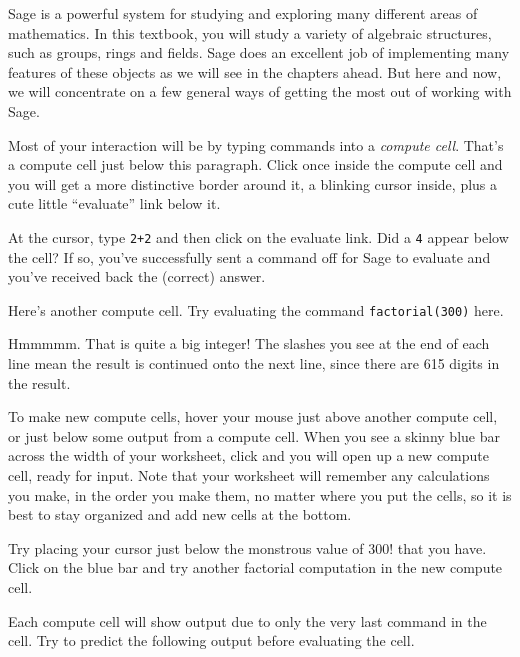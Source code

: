 Sage is a powerful system for studying and exploring many different areas of mathematics.  In this textbook, you will study a variety of algebraic structures, such as groups, rings and fields.  Sage does an excellent job of implementing many features of these objects as we will see in the chapters ahead.  But here and now, we will concentrate on a few general ways of getting the most out of working with Sage.\par
%
%
Most of your interaction will be by typing commands into a \emph{compute cell}.  That's a compute cell just below this paragraph.  Click once inside the compute cell and you will get a more distinctive border around it, a blinking cursor inside, plus a cute little ``evaluate'' link below it.\par
%
\begin{sageverbatim}

\end{sageverbatim}
%
At the cursor, type \verb?2+2? and then click on the evaluate link.  Did a \verb?4? appear below the cell?  If so, you've successfully sent a command off for Sage to evaluate and you've received back the (correct) answer.\par
%
Here's another compute cell.  Try evaluating the command \verb?factorial(300)? here.
%
\begin{sageverbatim}

\end{sageverbatim}
%
Hmmmmm.  That is quite a big integer!  The slashes you see at the end of each line mean the result is continued onto the next line, since there are 615 digits in the result.\par
%
To make new compute cells, hover your mouse just above another compute cell, or just below some output from a compute cell.  When you see a skinny blue bar across the width of your worksheet, click and you will open up a new compute cell, ready for input.  Note that your worksheet will remember any calculations you make, in the order you make them, no matter where you put the cells, so it is best to stay organized and add new cells at the bottom.\par
%
Try placing your cursor just below the monstrous value of $300!$ that you have.  Click on the blue bar and try another factorial computation in the new compute cell.\par
%
Each compute cell will show output due to only the very last command in the cell.  Try to predict the following output before evaluating the cell.
%
